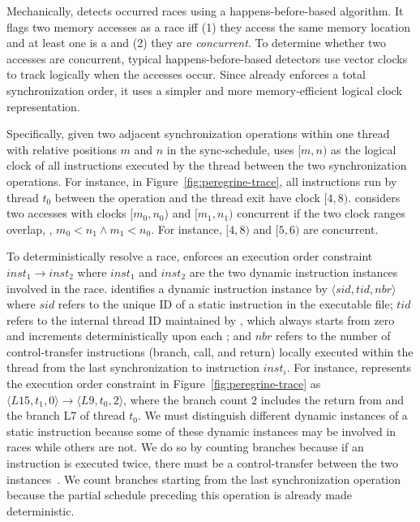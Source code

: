 Mechanically, \peregrine detects occurred races using a happens-before-based
algorithm.  It flags two memory accesses as a race iff (1) they access the
same memory location and at least one is a  and (2) they are
\emph{concurrent}.  To determine whether two accesses are concurrent,
typical happens-before-based detectors use vector
clocks~\cite{vectorclock} to track logically when the accesses occur.
Since \peregrine already enforces a total synchronization order, it uses a
simpler and more memory-efficient logical clock representation.

Specifically, given two adjacent synchronization operations within one
thread with relative positions $m$ and $n$ in the sync-schedule, \peregrine uses $[m,n)$ as
  the logical clock of all instructions executed by the thread between the
  two synchronization operations.  For instance, in
  Figure~\ref{fig:peregrine-trace}, all instructions run by thread $t_0$
  between the  operation and the thread exit have
  clock $[4, 8)$.
    \peregrine considers two accesses with clocks $[m_0, n_0)$
      and $[m_1, n_1)$ concurrent if the two clock ranges overlap, \ie,
        $m_0 < n_1 \wedge m_1 < n_0$.  For instance, $[4, 8)$ and $[5,
            6)$ are concurrent.

To deterministically resolve a race, \peregrine enforces an execution order
constraint $inst_1 \rightarrow inst_2$ where $inst_1$ and $inst_2$ are the
two dynamic instruction instances involved in the race.  \peregrine identifies a
dynamic instruction instance by $\langle sid, tid, nbr \rangle$ where
$sid$ refers to the unique ID of a static instruction in the executable
file; $tid$ refers to the internal thread ID maintained by \peregrine, which
always starts from zero and increments deterministically upon each
; and $nbr$ refers to the number of control-transfer
instructions (branch, call, and return) locally executed within the thread
from the last synchronization to instruction $inst_i$.  For instance, \peregrine
represents the execution order constraint in
Figure~\ref{fig:peregrine-trace} as $\langle L15,t_1,0\rangle \rightarrow
\langle L9,t_0,2 \rangle$, where the branch count $2$ includes the return
from  and the branch L7 of thread $t_0$.
We must distinguish different dynamic instances of a static instruction
because some of these dynamic instances may be involved in races while others
are not.  We do so by counting branches because if an instruction is
executed twice, there must be a control-transfer between
the two instances~\cite{smp-revirt:vee08}.  We count branches starting from the last
synchronization operation because the partial schedule preceding this
operation is already made deterministic.


